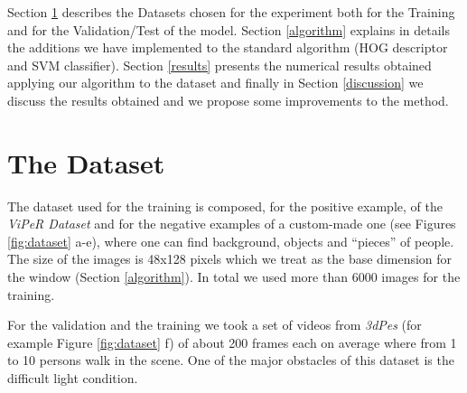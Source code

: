 \documentclass[a4paper,letterpaper, 11pt, onecolumn]{article} %
\begin{document}
Section \ref{dataset} describes the Datasets chosen for the experiment both for the Training and for the Validation/Test of the model. Section \ref{algorithm} explains in details the additions we have implemented to the standard algorithm (HOG descriptor and SVM classifier). Section \ref{results} presents the numerical results obtained applying our algorithm to the dataset and finally in Section \ref{discussion} we discuss the results obtained and we propose some improvements to the method.


\section{The Dataset}\label{dataset}
The dataset used for the training is composed, for the positive example, of the \emph{ViPeR Dataset} and for the negative examples of a custom-made one (see Figures \ref{fig:dataset} a-e), where one can find background, objects and ``pieces'' of people. 
The size of the images is 48x128 pixels which we treat as the base dimension for the window (Section \ref{algorithm}). In total we used more than 6000 images for the training.

For the validation and the training we took a set of videos from \emph{3dPes} (for example Figure \ref{fig:dataset} f) of about 200 frames each on average where from 1 to 10 persons walk in the scene. One of the major obstacles of this dataset is the difficult light condition.
\end{document}
